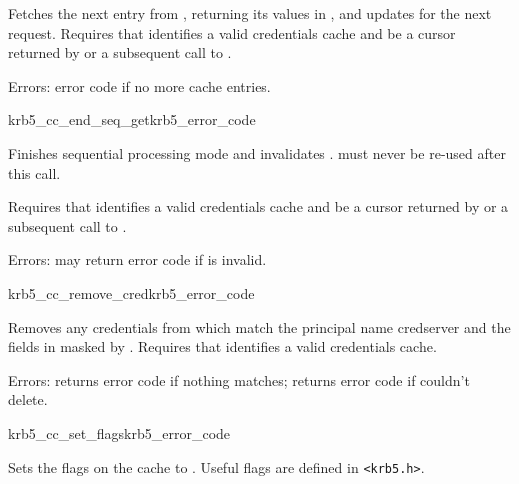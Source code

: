 Fetches the next entry from , returning its values in
, and updates  for the next request.
Requires that  identifies a valid credentials cache and
 be a cursor returned by
 or a subsequent call to
.

Errors: error code if no more cache entries.

\begin{funcdecl}{krb5_cc_end_seq_get}{krb5_error_code}{\funcinout}
\end{funcdecl}

Finishes sequential processing mode and invalidates .
 must never be re-used after this call.

Requires that  identifies a valid credentials cache and
 be a cursor returned by
 or a subsequent call to
.

Errors: may return error code if  is invalid.


\begin{funcdecl}{krb5_cc_remove_cred}{krb5_error_code}{\funcinout}
\funcin
{}
\end{funcdecl}

Removes any credentials from  which match the principal
name {cred{\ptsto}server} and the fields in  masked by
.
Requires that  identifies a valid credentials cache.

Errors: returns error code if nothing matches; returns error code if
couldn't delete.

\begin{funcdecl}{krb5_cc_set_flags}{krb5_error_code}{\funcinout}
\funcin
{}
\end{funcdecl}

Sets the flags on the cache  to .  Useful
flags are defined in {\tt <krb5.h>}.



